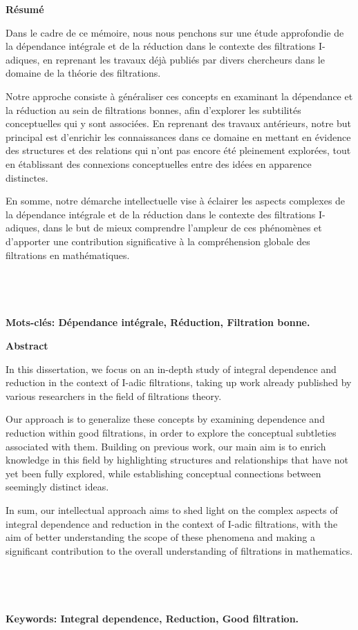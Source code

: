 \newpage
{}
\begin{center}
	\LARGE{\textbf{Résumé}}
\end{center}

Dans le cadre de ce mémoire, nous nous penchons sur une étude approfondie de la dépendance intégrale et de la réduction dans le contexte des filtrations I-adiques, en reprenant les travaux déjà publiés par divers chercheurs dans le domaine de la théorie des filtrations.

Notre approche consiste à généraliser ces concepts en examinant la dépendance et la réduction au sein de filtrations bonnes, afin d'explorer les subtilités conceptuelles qui y sont associées. En reprenant des travaux antérieurs, notre but principal est d'enrichir les connaissances dans ce domaine en mettant en évidence des structures et des relations qui n'ont pas encore été pleinement explorées, tout en établissant des connexions conceptuelles entre des idées en apparence distinctes.

En somme, notre démarche intellectuelle vise à éclairer les aspects complexes de la dépendance intégrale et de la réduction dans le contexte des filtrations I-adiques, dans le but de mieux comprendre l'ampleur de ces phénomènes et d'apporter une contribution significative à la compréhension globale des filtrations en mathématiques.
\\
\\
\\
\\
\\
\textbf{ Mots-clés: Dépendance intégrale, Réduction, Filtration bonne.} 



\newpage
{}
\begin{center}
	\LARGE{\textbf{Abstract}}
\end{center}

In this dissertation, we focus on an in-depth study of integral dependence and reduction in the context of I-adic filtrations, taking up work already published by various researchers in the field of filtrations theory.

Our approach is to generalize these concepts by examining dependence and reduction within good filtrations, in order to explore the conceptual subtleties associated with them. Building on previous work, our main aim is to enrich knowledge in this field by highlighting structures and relationships that have not yet been fully explored, while establishing conceptual connections between seemingly distinct ideas.

In sum, our intellectual approach aims to shed light on the complex aspects of integral dependence and reduction in the context of I-adic filtrations, with the aim of better understanding the scope of these phenomena and making a significant contribution to the overall understanding of filtrations in mathematics.
\\
\\
\\
\\
\\
\textbf{Keywords: Integral dependence, Reduction, Good filtration.} 